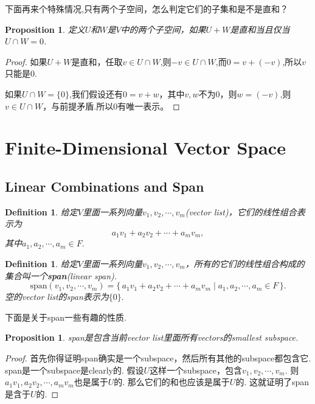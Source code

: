 \documentclass{article}
\newtheorem{proposition}[theorem]{Proposition}
\newtheorem{definition}[theorem]{Definition}
\newcommand\Set[2]{\{\,#1\mid#2\,\}} %
\begin{document}
{\color{red} 下面再来个特殊情况,只有两个子空间，怎么判定它们的子集和是不是直和}？

\begin{proposition}
定义$U$和$W$是$V$中的两个子空间，如果$U+W$是直和当且仅当$U \cap W = {0}$.
\end{proposition}

\begin{proof}
\Rightarrow 如果$U+W$是直和，任取$v \in U \cap W$,则$-v \in U \cap W$,而$0 = v + (-v)$,所以$v$只能是$0$.

\Leftarrow 如果$U \cap W = \{0\}$,我们假设还有$0 = v+w$，其中$v,w$不为0，则$w=(-v)$,则$v \in U \cap W$，与前提矛盾.所以$0$有唯一表示。
\end{proof}

\newpage
\section{Finite-Dimensional Vector Space}

\subsection{Linear Combinations and Span}

\begin{definition}
\rm 给定$V$里面一系列向量$v_1,v_2,\cdots,v_m$(vector list)，它们的线性组合表示为
$$
a_1v_1 + a_2v_2 + \cdots + a_mv_m,
$$
其中$a_1,a_2,\cdots,a_m \in F.$
\end{definition}

\begin{definition}
\rm 给定$V$里面一系列向量$v_1,v_2,\cdots,v_m$，所有的它们的线性组合构成的集合叫一个\textbf{span}(linear span). 
$$
\text{span}(v_1,v_2,\cdots,v_m) = \Set{a_1v_1 + a_2v_2 + \cdots + a_mv_m}{a_1,a_2,\cdots,a_m \in F}.
$$
空的vector list的span表示为$\{0\}.$
\end{definition}

{\color{red}下面是关于span一些有趣的性质}.

\begin{proposition}
\rm span是包含当前vector list里面所有vectors的smallest subspace.
\end{proposition}

\begin{proof}
首先你得证明span确实是一个subspace，然后所有其他的subspace都包含它. span是一个subspace是clearly的. 假设$U$这样一个subspace，包含$v_1,v_2,\cdots,v_m$. 则$a_1v_1,a_2v_2,\cdots,a_mv_m$也是属于$U$的. 那么它们的和也应该是属于$U$的. 这就证明了span是含于$U$的. 
\end{proof}
\end{document}
